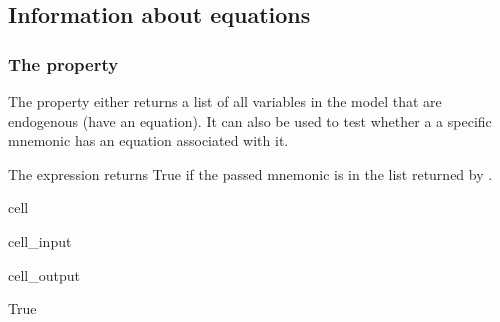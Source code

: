 \documentclass[letterpaper,10pt,english]{jupyterBook}
\begin{document}
\subsection{Information about equations}
\label{\detokenize{content/05_WBModels/LoadingWBModel:information-about-equations}}

\subsubsection{The  property}
\label{\detokenize{content/05_WBModels/LoadingWBModel:the-endogene-property}}
\sphinxAtStartPar
The   property either returns a list of all variables in the model that are endogenous (have an equation). It can also be used to test whether a a specific mnemonic has an equation associated with it.

\sphinxAtStartPar
The expression  returns True if the passed mnemonic is in the list returned by .

\begin{sphinxuseclass}{cell}\begin{sphinxVerbatimInput}

\begin{sphinxuseclass}{cell_input}
\begin{sphinxVerbatim}[commandchars=\\\{\}]
  
\end{sphinxVerbatim}

\end{sphinxuseclass}\end{sphinxVerbatimInput}
\begin{sphinxVerbatimOutput}

\begin{sphinxuseclass}{cell_output}
\begin{sphinxVerbatim}[commandchars=\\\{\}]
True
\end{sphinxVerbatim}

\end{sphinxuseclass}\end{sphinxVerbatimOutput}

\end{sphinxuseclass}
\end{document}
